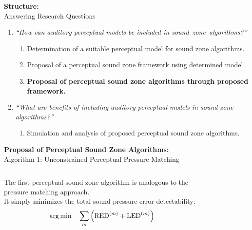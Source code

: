 \documentclass[aspectratio=169]{beamer}
\begin{document}
\begin{frame}{\textbf{Structure:}\\ Answering Research Questions}
    \begin{enumerate}
        \item {\textit{``How can auditory perceptual models be included in sound~zone~algorithms?''}}
            \vspace{7pt}
            \begin{enumerate}
                \item Determination of a suitable perceptual model for sound zone algorithms.
                \vspace{7pt}
                \item Proposal of a perceptual sound zone framework using determined model. 
                \vspace{7pt}
                \item \textbf{Proposal of perceptual sound zone algorithms through proposed framework.}
                \vspace{7pt}
            \end{enumerate}
        \item {\textit{``What are benefits of including auditory perceptual models in sound zone algorithms?''}}
            \vspace{-5pt}
            \begin{enumerate}
                \item Simulation and analysis of proposed perceptual sound zone algorithms.
            \end{enumerate}
    \end{enumerate}
\end{frame}

\begin{frame}{\textbf{Proposal of Perceptual Sound Zone Algorithms:}\\ Algorithm 1: Unconstrained Perceptual Pressure
    Matching}
    \begin{columns}[c]
        The first perceptual sound zone algorithm is analogous to the pressure matching approach.\\
        \vspace{7pt}
        It simply minimizes the total sound pressure error detectability:
        \begin{equation}
            \operatorname*{arg\,min}_{}\quad \sum_m \left(\text{RED}^{(m)} + \text{LED}^{(m)}\right)
        \end{equation}
        \begin{figure}[]
            \centering
            \scalebox{0.7}{}
        \end{figure}
    \end{columns}
\end{frame}
\end{document}
